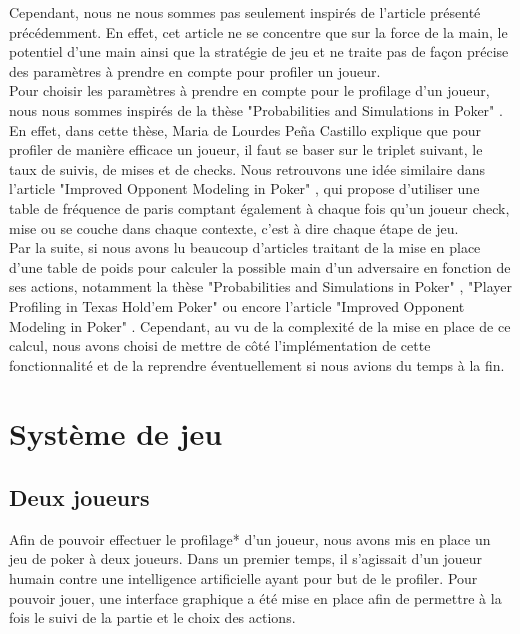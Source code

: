 \documentclass{report}
\begin{document}
Cependant, nous ne nous sommes pas seulement inspirés de l'article présenté précédemment. En effet, cet article ne se concentre que sur la force de la main, le potentiel d'une main ainsi que la stratégie de jeu et ne traite pas de façon précise des paramètres à prendre en compte pour profiler un joueur. \\

Pour choisir les paramètres à prendre en compte pour le profilage d'un joueur, nous nous sommes inspirés de la thèse "Probabilities and Simulations in Poker" \cite{probaiblitiesAndSimulationsInPoker}. En effet, dans cette thèse, Maria de Lourdes Peña Castillo explique que pour profiler de manière efficace un joueur, il faut se baser sur le triplet suivant, le taux de suivis, de mises et de checks. Nous retrouvons une idée similaire dans l'article "Improved Opponent Modeling in Poker" \cite{ImprovedOpponentModelingInPoker}, qui propose d'utiliser une table de fréquence de paris comptant également à chaque fois qu'un joueur check, mise ou se couche dans chaque contexte, c'est à dire chaque étape de jeu.\\

Par la suite, si nous avons lu beaucoup d'articles traitant de la mise en place d'une table de poids pour calculer la possible main d'un adversaire en fonction de ses actions, notamment la thèse "Probabilities and Simulations in Poker" \cite{probaiblitiesAndSimulationsInPoker}, "Player Profiling in Texas Hold'em Poker" \cite{PlayerProfilingInTexasHoldem} ou encore l'article "Improved Opponent Modeling in Poker" \cite{ImprovedOpponentModelingInPoker}. Cependant, au vu de la complexité de la mise en place de ce calcul, nous avons choisi de mettre de côté l'implémentation de cette fonctionnalité et de la reprendre éventuellement si nous avions du temps à la fin. \\

\section{Système de jeu}

\subsection{Deux joueurs}
\hspace{0.5cm}Afin de pouvoir effectuer le profilage* d'un joueur, nous avons mis en place un jeu de poker à deux joueurs. Dans un premier temps, il s'agissait d'un joueur humain contre une intelligence artificielle ayant pour but de le profiler. Pour pouvoir jouer, une interface graphique a été mise en place afin de permettre à la fois le suivi de la partie et le choix des actions.\\
\end{document}
